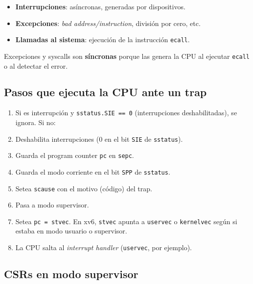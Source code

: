 \documentclass[11pt,a4paper]{article}
\begin{document}
\begin{itemize}[leftmargin=*]
    \item \textbf{Interrupciones}: asíncronas, generadas por
        dispositivos.
    \item \textbf{Excepciones}: \emph{bad address/instruction},
        división por cero, etc.
    \item \textbf{Llamadas al sistema}: ejecución de la instrucción
        \texttt{ecall}.
\end{itemize}

Excepciones y syscalls son \textbf{síncronas} porque las genera la
CPU al ejecutar \texttt{ecall} o al detectar el error.

\subsection{Pasos que ejecuta la CPU ante un trap}

\begin{enumerate}[leftmargin=*]
    \item Si es interrupción y \verb|sstatus.SIE == 0| (interrupciones
        deshabilitadas), se ignora. Si no:
    \item Deshabilita interrupciones (0 en el bit \texttt{SIE} de
        \texttt{sstatus}).
    \item Guarda el program counter \texttt{pc} en \texttt{sepc}.
    \item Guarda el modo corriente en el bit \texttt{SPP} de
        \texttt{sstatus}.
    \item Setea \texttt{scause} con el motivo (código) del trap.
    \item Pasa a modo supervisor.
    \item Setea \verb|pc = stvec|. En xv6, \texttt{stvec} apunta a
        \texttt{uservec} o \texttt{kernelvec} según si estaba en modo
        usuario o supervisor.
    \item La CPU salta al \emph{interrupt handler} (\texttt{uservec},
        por ejemplo).
\end{enumerate}

\subsection{CSRs en modo supervisor}
\end{document}
